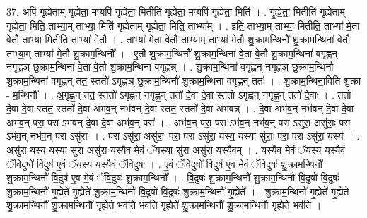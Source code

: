 \documentclass[17pt]{extarticle}
\begin{document}
37. अपि॑ गृह्येताम् गृह्येता॒ मप्यपि॑ गृह्येता॒ मितीति॑ गृह्येता॒ मप्यपि॑ गृह्येता॒ मिति॑ । . गृ॒ह्ये॒ता॒ मितीति॑ गृह्येताम् गृह्येता॒ मिति॒ ताभ्या॒म् ताभ्या॒ मिति॑ गृह्येताम् गृह्येता॒ मिति॒ ताभ्या᳚म् । . इति॒ ताभ्या॒म् ताभ्या॒ मितीति॒ ताभ्या॑ मे॒ता वे॒तौ ताभ्या॒ मितीति॒ ताभ्या॑ मे॒तौ । . ताभ्या॑ मे॒ता वे॒तौ ताभ्या॒म् ताभ्या॑ मे॒तौ शु॒क्राम॒न्थिनौ॑ शु॒क्राम॒न्थिना॑ वे॒तौ ताभ्या॒म् ताभ्या॑ मे॒तौ शु॒क्राम॒न्थिनौ᳚ । . ए॒तौ शु॒क्राम॒न्थिनौ॑ शु॒क्राम॒न्थिना॑ वे॒ता वे॒तौ शु॒क्राम॒न्थिना॑ वगृह्णन् नगृह्णञ् छु॒क्राम॒न्थिना॑ वे॒ता वे॒तौ शु॒क्राम॒न्थिना॑ वगृह्णन्न् । . शु॒क्राम॒न्थिना॑ वगृह्णन् नगृह्णञ् छु॒क्राम॒न्थिनौ॑ शु॒क्राम॒न्थिना॑ वगृह्ण॒न् तत॒ स्ततो॑ ऽगृह्णञ् छु॒क्राम॒न्थिनौ॑ शु॒क्राम॒न्थिना॑ वगृह्ण॒न् ततः॑ । . शु॒क्राम॒न्थिना॒विति॑ शु॒क्रा - म॒न्थिनौ᳚ । . अ॒गृ॒ह्ण॒न् तत॒ स्ततो॑ ऽगृह्णन् नगृह्ण॒न् ततो॑ दे॒वा दे॒वा स्ततो॑ ऽगृह्णन् नगृह्ण॒न् ततो॑ दे॒वाः । . ततो॑ दे॒वा दे॒वा स्तत॒ स्ततो॑ दे॒वा अभ॑व॒न् नभ॑वन् दे॒वा स्तत॒ स्ततो॑ दे॒वा अभ॑वन्न् । . दे॒वा अभ॑व॒न् नभ॑वन् दे॒वा दे॒वा अभ॑व॒न् परा॒ परा ऽभ॑वन् दे॒वा दे॒वा अभ॑व॒न् परा᳚ । . अभ॑व॒न् परा॒ परा ऽभ॑व॒न् नभ॑व॒न् परा ऽसु॑रा॒ असु॑राः॒ परा ऽभ॑व॒न् नभ॑व॒न् परा ऽसु॑राः । . परा ऽसु॑रा॒ असु॑राः॒ परा॒ परा ऽसु॑रा॒ यस्य॒ यस्या सु॑राः॒ परा॒ परा ऽसु॑रा॒ यस्य॑ । . असु॑रा॒ यस्य॒ यस्या सु॑रा॒ असु॑रा॒ यस्यै॒व मे॒वं ॅयस्या सु॑रा॒ असु॑रा॒ यस्यै॒वम् । . यस्यै॒व मे॒वं ॅयस्य॒ यस्यै॒वं ॅवि॒दुषो॑ वि॒दुष॑ ए॒वं ॅयस्य॒ यस्यै॒वं ॅवि॒दुषः॑ । . ए॒वं ॅवि॒दुषो॑ वि॒दुष॑ ए॒व मे॒वं ॅवि॒दुषः॑ शु॒क्राम॒न्थिनौ॑ शु॒क्राम॒न्थिनौ॑ वि॒दुष॑ ए॒व मे॒वं ॅवि॒दुषः॑ शु॒क्राम॒न्थिनौ᳚ । . वि॒दुषः॑ शु॒क्राम॒न्थिनौ॑ शु॒क्राम॒न्थिनौ॑ वि॒दुषो॑ वि॒दुषः॑ शु॒क्राम॒न्थिनौ॑ गृ॒ह्येते॑ गृ॒ह्येते॑ शु॒क्राम॒न्थिनौ॑ वि॒दुषो॑ वि॒दुषः॑ शु॒क्राम॒न्थिनौ॑ गृ॒ह्येते᳚ । . शु॒क्राम॒न्थिनौ॑ गृ॒ह्येते॑ गृ॒ह्येते॑ शु॒क्राम॒न्थिनौ॑ शु॒क्राम॒न्थिनौ॑ गृ॒ह्येते॒ भव॑ति॒ भव॑ति गृ॒ह्येते॑ शु॒क्राम॒न्थिनौ॑ शु॒क्राम॒न्थिनौ॑ गृ॒ह्येते॒ भव॑ति । \newline
\end{document}
